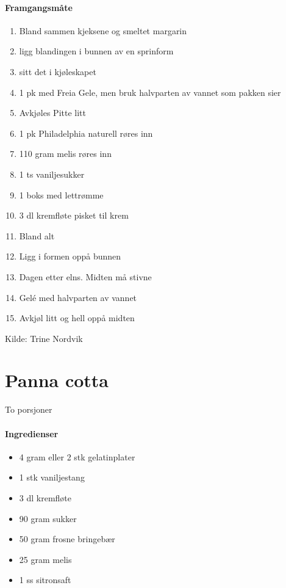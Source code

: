 \documentclass[12pt,a4paper]{book}
\begin{document}
\paragraph{Framgangsmåte}
\begin{enumerate}[noitemsep]
	\item Bland sammen kjeksene og smeltet margarin
	\item ligg blandingen i bunnen av en sprinform
	\item sitt det i kjøleskapet
	\item 1 pk med Freia Gele, men bruk halvparten av vannet som pakken sier
	\item Avkjøles Pitte litt
	\item 1 pk Philadelphia naturell røres inn
	\item 110 gram melis røres inn
	\item 1 ts vaniljesukker
	\item 1 boks med lettrømme
	\item 3 dl kremfløte pisket til krem
	\item Bland alt
	\item Ligg i formen oppå bunnen
	\item Dagen etter elns.  Midten må stivne
	\item Gelé med halvparten av vannet
	\item Avkjøl litt og hell oppå midten
\end{enumerate}

Kilde: Trine Nordvik
\clearpage{}
\clearpage{}\section{﻿Panna cotta}
\label{pannacotta}
To porsjoner

\paragraph{Ingredienser}
\begin{itemize}[noitemsep]
	\item 4 gram eller 2 stk gelatinplater
	\item 1 stk vaniljestang
	\item 3 dl kremfløte
	\item 90 gram sukker
	\item 50 gram frosne bringebær
	\item 25 gram melis
	\item 1 ss sitronsaft
\end{itemize}
\end{document}
